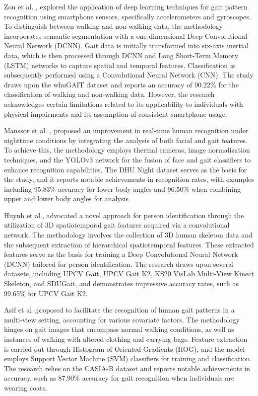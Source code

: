 \documentclass[12pt,a4paper]{article}
\begin{document}
Zou et al. \cite{zou2020}, explored the application of deep learning techniques for gait pattern recognition using smartphone sensors, specifically accelerometers and gyroscopes. To distinguish between walking and non-walking data, the methodology incorporates semantic segmentation with a one-dimensional Deep Convolutional Neural Network (DCNN). Gait data is initially transformed into six-axis inertial data, which is then processed through DCNN and Long Short-Term Memory (LSTM) networks to capture spatial and temporal features. Classification is subsequently performed using a Convolutional Neural Network (CNN). The study draws upon the whuGAIT dataset and reports an accuracy of 90.22\% for the classification of walking and non-walking data. However, the research acknowledges certain limitations related to its applicability to individuals with physical impairments and its assumption of consistent smartphone usage.

Manssor et al. \cite{manssor2021}, proposed an improvement in  real-time human recognition under nighttime conditions by integrating the analysis of both facial and gait features. To achieve this, the methodology employs thermal cameras, image normalization techniques, and the YOLOv3 network for the fusion of face and gait classifiers to enhance recognition capabilities. The DHU Night dataset serves as the basis for the study, and it reports notable achievements in recognition rates, with examples including 95.83\% accuracy for lower body angles and 96.50\% when combining upper and lower body angles for analysis.

 Huynh et al.\cite{huynh2020}, advocated a novel approach for person identification through the utilization of 3D spatiotemporal gait features acquired via a convolutional network. The methodology involves the collection of 3D human skeleton data and the subsequent extraction of hierarchical spatiotemporal features. These extracted features serve as the basis for training a Deep Convolutional Neural Network (DCNN) tailored for person identification. The research draws upon several datasets, including UPCV Gait, UPCV Gait K2, KS20 VisLab Multi-View Kinect Skeleton, and SDUGait, and demonstrates impressive accuracy rates, such as 99.65\% for UPCV Gait K2.

Asif et al \cite{asif2022},proposed to facilitate the recognition of human gait patterns in a multi-view setting, accounting for various covariate factors. The methodology hinges on gait images that encompass normal walking conditions, as well as instances of walking with altered clothing and carrying bags. Feature extraction is carried out through Histogram of Oriented Gradients (HOG), and the model employs Support Vector Machine (SVM) classifiers for training and classification. The research relies on the CASIA-B dataset and reports notable achievements in accuracy, such as 87.90\% accuracy for gait recognition when individuals are wearing coats.
\end{document}
